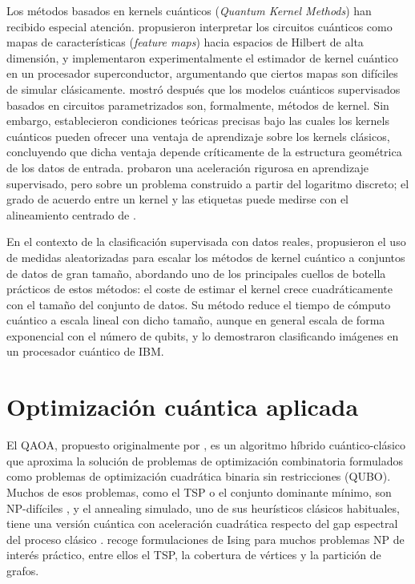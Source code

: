Los métodos basados en kernels cuánticos (\textit{Quantum Kernel Methods}) han recibido especial atención. \cite{schuld2021} propusieron interpretar los circuitos cuánticos como mapas de características (\textit{feature maps}) hacia espacios de Hilbert de alta dimensión, y \cite{havlicek2019} implementaron experimentalmente el estimador de kernel cuántico en un procesador superconductor, argumentando que ciertos mapas son difíciles de simular clásicamente. \cite{schuld2021kernels} mostró después que los modelos cuánticos supervisados basados en circuitos parametrizados son, formalmente, métodos de kernel. Sin embargo, \cite{huang2021} establecieron condiciones teóricas precisas bajo las cuales los kernels cuánticos pueden ofrecer una ventaja de aprendizaje sobre los kernels clásicos, concluyendo que dicha ventaja depende críticamente de la estructura geométrica de los datos de entrada. \cite{liu2021} probaron una aceleración rigurosa en aprendizaje supervisado, pero sobre un problema construido a partir del logaritmo discreto; el grado de acuerdo entre un kernel y las etiquetas puede medirse con el alineamiento centrado de \cite{cortes2012}.

En el contexto de la clasificación supervisada con datos reales, \cite{haug2023} propusieron el uso de medidas aleatorizadas para escalar los métodos de kernel cuántico a conjuntos de datos de gran tamaño, abordando uno de los principales cuellos de botella prácticos de estos métodos: el coste de estimar el kernel crece cuadráticamente con el tamaño del conjunto de datos. Su método reduce el tiempo de cómputo cuántico a escala lineal con dicho tamaño, aunque en general escala de forma exponencial con el número de qubits, y lo demostraron clasificando imágenes en un procesador cuántico de IBM.

\section{Optimización cuántica aplicada}

El QAOA, propuesto originalmente por \cite{farhi2014}, es un algoritmo híbrido cuántico-clásico que aproxima la solución de problemas de optimización combinatoria formulados como problemas de optimización cuadrática binaria sin restricciones (QUBO). Muchos de esos problemas, como el TSP o el conjunto dominante mínimo, son NP-difíciles \citep{garey1979}, y el annealing simulado, uno de sus heurísticos clásicos habituales, tiene una versión cuántica con aceleración cuadrática respecto del gap espectral del proceso clásico \citep{somma2008}. \citet{lucas2014} recoge formulaciones de Ising para muchos problemas NP de interés práctico, entre ellos el TSP, la cobertura de vértices y la partición de grafos.

